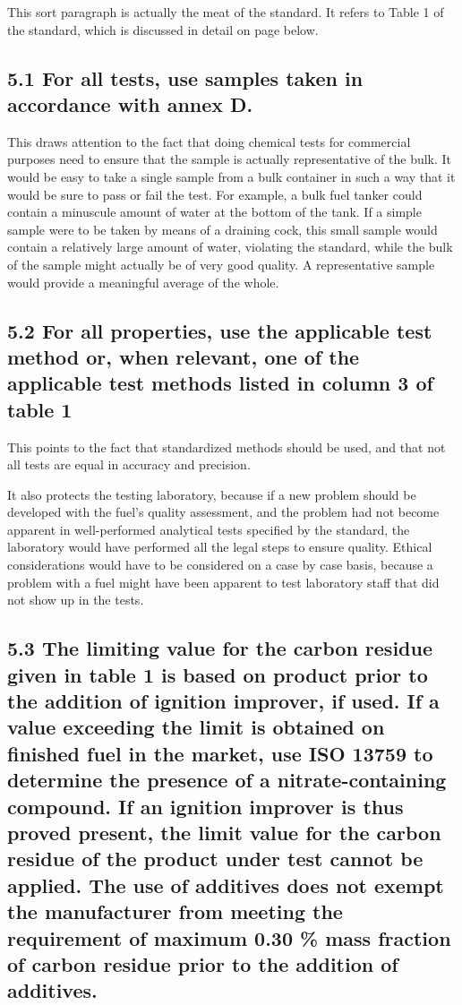 This sort paragraph is actually the meat of the standard. It refers to Table 1 of the standard, which is discussed in detail on page \pageref{table1} below.

\subsection{5.1 For all tests, use samples taken in accordance with annex D.}

This draws attention to the fact that doing chemical tests for commercial purposes need to ensure that the sample is actually representative of the bulk. It would be easy to take a single sample from a bulk container in such a way that it would be sure to pass or fail the test. For example, a bulk fuel tanker could contain a minuscule amount of water at the bottom of the tank. If a simple sample were to be taken by means of a draining cock, this small sample would contain a relatively large amount of water, violating the standard, while the bulk of the sample might actually be of very good quality. A representative sample would provide a meaningful average of the whole. 

\subsection{5.2 For all properties, use the applicable test method or, when relevant, one of the applicable test
methods listed in column 3 of table 1}

This points to the fact that standardized methods should be used, and that not all tests are equal in accuracy and precision.

It also protects the testing laboratory, because if a new problem should be developed with the fuel's quality assessment, and the problem had not become apparent in well-performed analytical tests specified by the standard, the laboratory would have performed all the legal steps to ensure quality. Ethical considerations would have to be considered on a case by case basis, because a problem with a fuel might have been apparent to test laboratory staff that did not show up in the tests.
	
\subsection{5.3 The limiting value for the carbon residue given in table 1 is based on product prior to the addition of ignition improver, if used. If a value exceeding the limit is obtained on finished fuel in the market, use ISO 13759 to determine the presence of a nitrate-containing compound. If an ignition improver is thus proved present, the limit value for the carbon residue of the product under test cannot be applied. The use of additives does not exempt the manufacturer from meeting the requirement of maximum 0.30 \% mass fraction of carbon residue prior to the addition of additives.}

